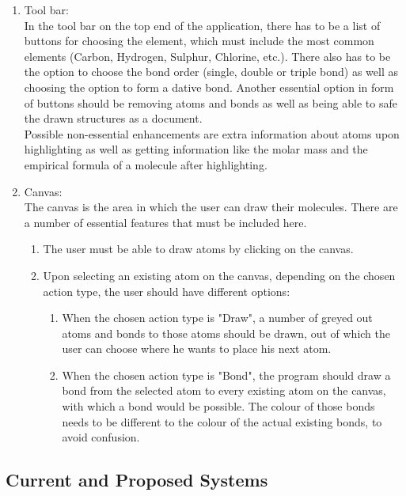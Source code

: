 \documentclass[a4paper,12pt]{article}
\begin{document}
\begin{enumerate}

\item Tool bar:\\
In the tool bar on the top end of the application, there has to be a list of buttons for choosing the element, which must include the most common elements (Carbon, Hydrogen, Sulphur, Chlorine, etc.). There also has to be the option to choose the bond order (single, double or triple bond) as well as choosing the option to form a dative bond. Another essential option in form of buttons should be removing atoms and bonds as well as being able to safe the drawn structures as a document.\\
Possible non-essential enhancements are extra information about atoms upon highlighting as well as getting information like the molar mass and the empirical formula of a molecule after highlighting.
\item Canvas:\\
The canvas is the area in which the user can draw their molecules. There are a number of essential features that must be included here.\\
	\begin{enumerate}
	\item The user must be able to draw atoms by clicking on the canvas.
	\item Upon selecting an existing atom on the canvas, depending on the chosen action type, the user should have different options:
		\begin{enumerate}
		\item When the chosen action type is "Draw", a number of greyed out atoms and bonds to those atoms should be drawn, out of which the user can choose where he wants to place his next atom.
		\item When the chosen action type is "Bond", the program should draw a bond from the selected atom to every existing atom on the canvas, with which a bond would be possible. The colour of those bonds needs to be different to the colour of the actual existing 		bonds, to avoid confusion.
		\end{enumerate}
	\end{enumerate}
\end{enumerate}

\subsection{Current and Proposed Systems}
\end{document}
